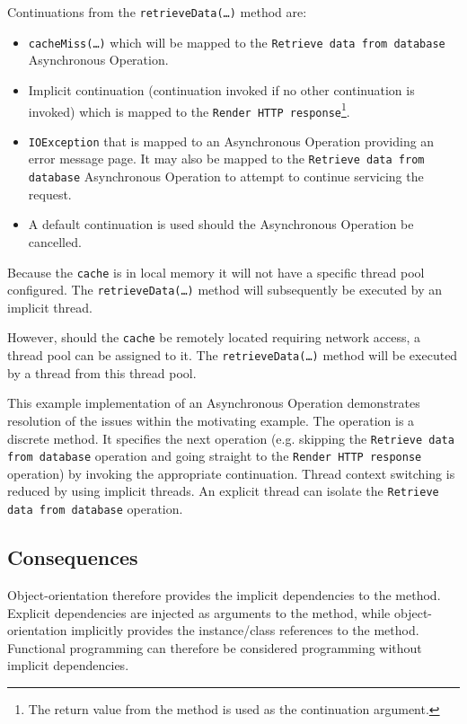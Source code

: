 \documentclass[prodmode]{style/acmlarge}
\begin{document}
Continuations from the \texttt{retrieveData(\ldots)} method are:
\begin{itemize}
  \item \texttt{cacheMiss(\ldots)} which will be mapped to the \texttt{Retrieve data from database} Asynchronous Operation.
  \item Implicit continuation (continuation invoked if no other continuation is invoked) which is mapped to the \texttt{Render HTTP response}\footnote{The return value from the method is used as the continuation argument.}.
  \item \texttt{IOException} that is mapped to an Asynchronous Operation providing an error message page.  It may also be mapped to the \texttt{Retrieve data from database} Asynchronous Operation to attempt to continue servicing the request.
  \item A default continuation is used should the Asynchronous Operation be cancelled.
\end{itemize}

Because the \texttt{cache} is in local memory it will not have a specific thread
pool configured.  The \texttt{retrieveData(\ldots)} method will subsequently be
executed by an implicit thread.

However, should the \texttt{cache} be remotely located requiring network access,
a thread pool can be assigned to it.  The \texttt{retrieveData(\ldots)} method
will be executed by a thread from this thread pool.

This example implementation of an Asynchronous Operation demonstrates resolution
of the issues within the motivating example.  The operation is a discrete
method.  It specifies the next operation (e.g. skipping the \texttt{Retrieve
data from database} operation and going straight to the \texttt{Render HTTP
response} operation) by invoking the appropriate continuation.  Thread context
switching is reduced by using implicit threads.  An explicit thread can isolate
the \texttt{Retrieve data from database} operation.


\subsection{Consequences}

Object-orientation therefore provides the implicit dependencies to the
method.  Explicit dependencies are injected as arguments to the method, while
object-orientation implicitly provides the instance/class references to the
method.  Functional programming can therefore be considered programming without
implicit dependencies.
\end{document}
